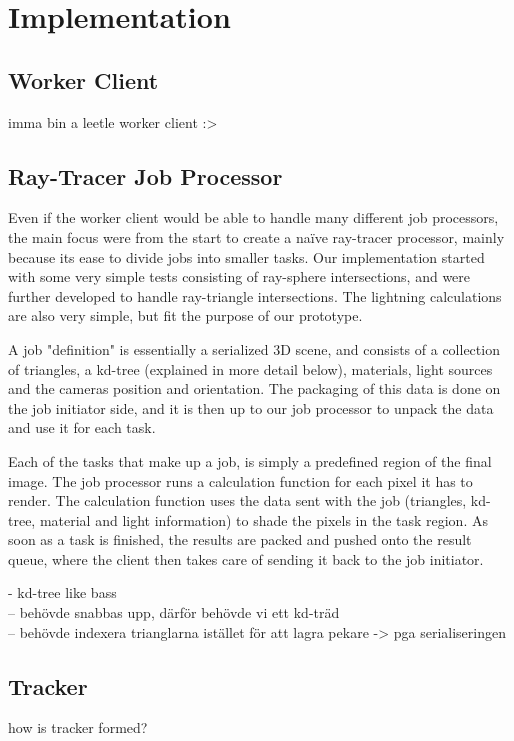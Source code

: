 \chapter{Implementation}

\section{Worker Client}
imma bin a leetle worker client :>

\section{Ray-Tracer Job Processor}
Even if the worker client would be able to handle many different job processors, the main focus were from the start to create a naïve ray-tracer processor, mainly because its ease to divide jobs into smaller tasks. Our implementation started with some very simple tests consisting of ray-sphere intersections, and were further developed to handle ray-triangle intersections. The lightning calculations are also very simple, but fit the purpose of our prototype.

A job "definition" is essentially a serialized 3D scene, and consists of a collection of triangles, a kd-tree (explained in more detail below), materials, light sources and the cameras position and orientation. The packaging of this data is done on the job initiator side, and it is then up to our job processor to unpack the data and use it for each task.

Each of the tasks that make up a job, is simply a predefined region of the final image. The job processor runs a calculation function for each pixel it has to render. The calculation function uses the data sent with the job (triangles, kd-tree, material and light information) to shade the pixels in the task region. As soon as a task is finished, the results are packed and pushed onto the result queue, where the client then takes care of sending it back to the job initiator.

- kd-tree like bass\\
  -- behövde snabbas upp, därför behövde vi ett kd-träd\\
  -- behövde indexera trianglarna istället för att lagra pekare -> pga serialiseringen\\
  
  

\section{Tracker}
how is tracker formed?